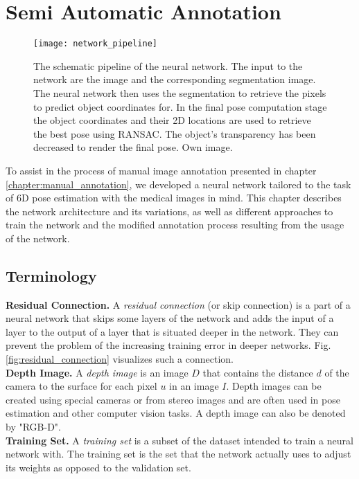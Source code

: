 \chapter{Semi Automatic Annotation} \label{chapter:semi_automatic}

\begin{figure}[!tbp]
	\centering
    \texttt{[image: network\_pipeline]}
    \caption{The schematic pipeline of the neural network. The input to the network are the image and the corresponding segmentation image. The neural network then uses the segmentation to retrieve the pixels to predict object coordinates for. In the final pose computation stage the object coordinates and their 2D locations are used to retrieve the best pose using RANSAC. The object's transparency has been decreased to render the final pose. Own image.}
    	\label{fig:network_pipeline}
\end{figure} 

To assist in the process of manual image annotation presented in chapter \ref{chapter:manual_annotation}, we developed a neural network tailored to the task of 6D pose estimation with the medical images in mind. This chapter describes the network architecture and its variations, as well as different approaches to train the network and the modified annotation process resulting from the usage of the network.

\section{Terminology}

\noindent\textbf{Residual Connection.} A \textit{residual connection} (or skip connection) is a part of a neural network that skips some layers of the network and adds the input of a layer to the output of a layer that is situated deeper in the network. They can prevent the problem of the increasing training error in deeper networks. Fig. \ref{fig:residual_connection} visualizes such a connection. \\

\noindent\textbf{Depth Image.} A \textit{depth image} is an image $D$ that contains the distance $d$ of the camera to the surface for each pixel $u$ in an image $I$. Depth images can be created using special cameras or from stereo images and are often used in pose estimation and other computer vision tasks. A depth image can also be denoted by "RGB-D". \\

\noindent\textbf{Training Set.} A \textit{training set} is a subset of the dataset intended to train a neural network with. The training set is the set that the network actually uses to adjust its weights as opposed to the validation set. \\

